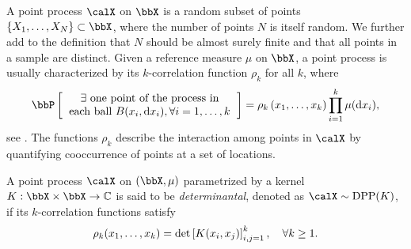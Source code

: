 \documentclass[twoside,11pt]{article}
\begin{document}
    A point process $\calX$ on $\bbX$ is a random subset of points $\lrcb{X_1, \dots, X_N} \subset \bbX$, where the number of points $N$ is itself random.
    We further add to the definition that $N$ should be almost surely finite and that all points in a sample are distinct.
    Given a reference measure $\mu$ on $\bbX$, a point process is usually characterized by its $k$-correlation function $\rho_k$ for all $k$, where
    \begin{equation}
    	\Proba{
    		\begin{tabular}{c}
    			$\exists$ one point of the process in\\
    			each ball $B(x_i, \diff x_i), \forall i=1,\dots, k $
    		\end{tabular}
    	}
    	= \rho_k\lrp{x_1,\dots,x_k}
    		\prod_{i=1}^k \mu(\diff x_i),
    \end{equation}
    see \citet[Section 4]{MoWa04}.
    The functions $\rho_k$ describe the interaction among points in $\calX$ by quantifying cooccurrence of points at a set of locations.


    A point process $\calX$ on $(\bbX,\mu)$ parametrized by a kernel $K:\bbX\times \bbX\rightarrow \mathbb{C}$ is said to be \emph{determinantal}, denoted as $\calX\sim\DPP(K)$, if its $k$-correlation functions satisfy
	  \begin{equation}
	  \label{eq:k-correlation_function_DPP}
	    \rho_k(x_1,\dots,x_k)
	      = \det \left[ K(x_i, x_j) \right]_{i,j=1}^k,
	    \quad \forall k\geq 1.
	  \end{equation}
\end{document}
